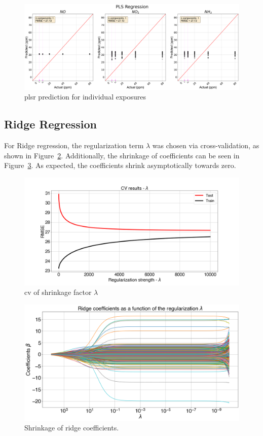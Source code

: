\begin{figure}[h]
	\centering
	\includegraphics[width=1\textwidth]{../figures/pls-exposures.png}
	\caption{\acrshort{plsr} prediction for individual exposures}
	\label{fig:plsr-exposures}
\end{figure}

\newpage
\subsection{Ridge Regression}

For Ridge regression, the regularization term $\lambda$ was chosen via cross-validation, as shown in Figure~\ref{fig:ridge-cv-exposures}. Additionally, the shrinkage of coefficients can be seen in Figure~\ref{fig:ridge-shrink}. As expected, the coefficients shrink asymptotically towards zero.

\begin{figure}[h]
	\centering
	\includegraphics[width=1\textwidth]{../figures/ridge-cv-exposures.png}
	\caption{\acrshort{cv} of shrinkage factor $\lambda$}
	\label{fig:ridge-cv-exposures}
\end{figure}

\begin{figure}[h]
	\centering
	\includegraphics[width=1\textwidth]{../figures/ridge-coefs.png}
	\caption{Shrinkage of ridge coefficients.}
	\label{fig:ridge-shrink}
\end{figure}

